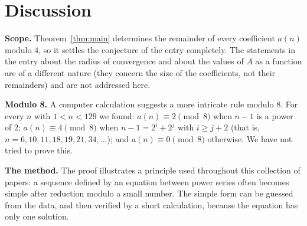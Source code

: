 \documentclass[11pt,a4paper]{article}
\theoremstyle{definition}
\theoremstyle{remark}
\newcommand{\para}[1]{\par\medskip\noindent\textbf{#1}\enspace}
\begin{document}
\section{Discussion}\label{sec:discussion}

\para{Scope.} Theorem~\ref{thm:main} determines the remainder of every coefficient $a(n)$ modulo $4$, so it settles the
conjecture of the entry completely. The statements in the entry about the radius of convergence and about the values of
$A$ as a function are of a different nature (they concern the size of the coefficients, not their remainders) and are not
addressed here.

\para{Modulo 8.} A computer calculation suggests a more intricate rule modulo $8$. For every $n$ with $1<n<129$ we found:
$a(n)\equiv2\pmod8$ when $n-1$ is a power of $2$; $a(n)\equiv4\pmod8$ when $n-1=2^i+2^j$ with $i\ge j+2$ (that is,
$n=6,10,11,18,19,21,34,\dots$); and $a(n)\equiv0\pmod8$ otherwise. We have not tried to prove this.

\para{The method.} The proof illustrates a principle used throughout this collection of papers: a sequence defined by
an equation between power series often becomes simple after reduction modulo a small number. The simple form can be
guessed from the data, and then verified by a short calculation, because the equation has only one solution.
\end{document}

